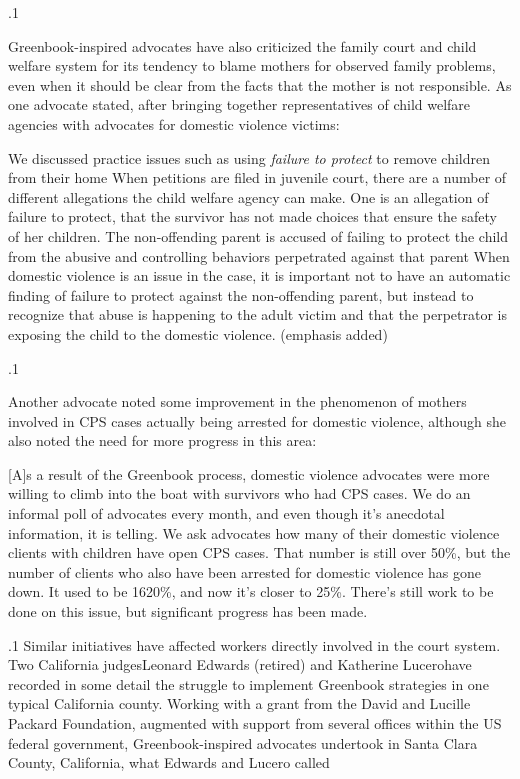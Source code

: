 \documentclass[11pt, twoside]{article}
\begin{document}
{\p.1{%
Greenbook-inspired advocates have also criticized the family court
and child welfare system for its tendency to blame mothers for observed family problems, even when it should be clear from the facts
that the mother is not responsible. As one advocate stated, after bringing together representatives of child welfare agencies with advocates for
domestic violence victims:

\begin{blockQuote}
We discussed practice issues such as using \textit{failure to protect} to remove children from their home\ellFour{2pt}{2pt} When petitions are filed in
juvenile court, there are a number of different allegations the child
welfare agency can make. One is an allegation of failure to protect,
that the survivor has not made choices that ensure the safety of her
children. The non-offending parent is accused of failing to protect
the child from the abusive and controlling behaviors perpetrated
against that parent\ellFour{2pt}{2pt} When domestic violence is an issue in the
case, it is important not to have an automatic finding of failure to
protect against the non-offending parent, but instead to recognize
that abuse is happening to the adult victim and that the perpetrator
is exposing the child to the domestic violence. (emphasis added)
\end{blockQuote}

}%

\p.1{%
Another advocate noted some improvement in the phenomenon of
mothers involved in CPS cases actually being arrested for domestic
violence, although she also noted the need for more progress in this area:

\begin{blockQuote}
{[A]}s a result of the Greenbook process, domestic violence advocates
were more willing to climb into the boat with survivors who had
CPS cases. We do an informal poll of advocates every month, and
even though it’s anecdotal information, it is telling. We ask advocates how many of their domestic violence clients with children
have open CPS cases. That number is still over 50\%, but the
number of clients who also have been arrested for domestic violence
has gone down. It used to be 16\ndash{}20\%, and now it’s closer to 2\ndash{}5\%.
There’s still work to be done on this issue, but significant progress
has been made.
\end{blockQuote}

}%

\p.1{%
Similar initiatives have affected workers directly involved in the
court system. Two California judges\mdash{}Leonard Edwards (retired) and
Katherine Lucero\mdash{}have recorded in some detail the struggle to implement Greenbook strategies in one typical California county. Working
with a grant from the David and Lucille Packard Foundation, augmented with support from several offices within the US federal government, Greenbook-inspired advocates undertook in Santa Clara County,
California, what Edwards and Lucero called 
}%

}
\end{document}
